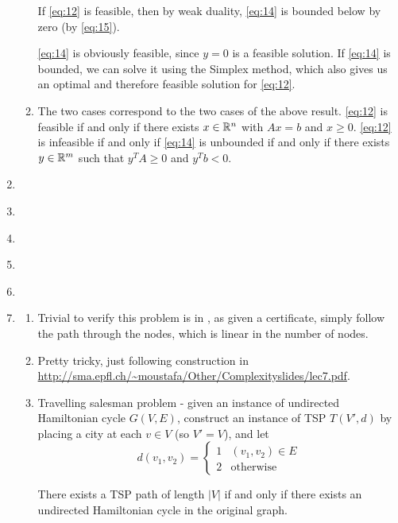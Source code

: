 \begin{enumerate}
\begin{enumerate}
    If \eqref{eq:12} is feasible, then by weak duality, \eqref{eq:14}
    is bounded below by zero (by \eqref{eq:15}).

    \eqref{eq:14} is obviously feasible, since $y = 0$ is a feasible
    solution.  If \eqref{eq:14} is bounded, we can solve it using the
    Simplex method, which also gives us an optimal and therefore
    feasible solution for \eqref{eq:12}.
  \item The two cases correspond to the two cases of the above result.
    \eqref{eq:12} is feasible if and only if there exists $x \in
    \mathbb{R}^{n}$ with $Ax = b$ and $x \geq 0$. \eqref{eq:12} is infeasible
    if and only if \eqref{eq:14} is unbounded if and only if there
    exists $y \in \mathbb{R}^{m}$ such that $y^{T}A \geq 0$ and $y^{T}b < 0$.
  \end{enumerate}
\item \label{item:6}
  
  
\item \label{item:7}
  
\item \label{item:8}

\item \label{item:9}
  
\item \label{item:10}
\item \label{item:11}
  \begin{enumerate}
  \item
    Trivial to verify this problem is in \np, as given a certificate,
    simply follow the path through the nodes, which is linear in the
    number of nodes.
  \item
    Pretty tricky, just following construction in
    \url{http://sma.epfl.ch/~moustafa/Other/Complexityslides/lec7.pdf}.
  \item
    Travelling salesman problem - given an instance of undirected
    Hamiltonian cycle $G(V, E)$, construct an instance of TSP $T(V', d)$ by
    placing a city at each $v \in V$ (so $V' = V$), and let
    \begin{equation}
      \label{eq:1}
      d(v_{1}, v_{2}) =
      \begin{cases}
        1 & (v_{1}, v_{2}) \in E \\
        2 & \text{otherwise}
      \end{cases}
    \end{equation}

    There exists a TSP path of length $|V|$ if and only if there exists an
    undirected Hamiltonian cycle in the original graph.


\end{enumerate}
\end{enumerate}
